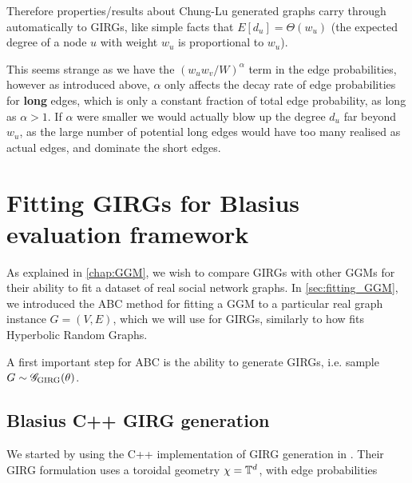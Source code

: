 Therefore properties/results about Chung-Lu generated graphs carry through automatically to GIRGs, like simple facts that $E[d_u] = \Theta(w_u)$ (the expected degree of a node $u$ with weight $w_u$ is proportional to $w_u$).

This seems strange as we have the $(w_u w_v / W)^\alpha$ term in the edge probabilities, however as introduced above, $\alpha$ only affects the decay rate of edge probabilities for \textbf{long} edges, which is only a constant fraction of total edge probability, as long as $\alpha > 1$. If $\alpha$ were smaller we would actually blow up the degree $d_u$ far beyond $w_u$, as the large number of potential long edges would have too many realised as actual edges, and dominate the short edges.




\section{Fitting GIRGs for Blasius evaluation framework}
As explained in \cref{chap:GGM}, we wish to compare GIRGs with other GGMs for their ability to fit a dataset of real social network graphs. 
In \cref{sec:fitting_GGM}, we introduced the ABC method for fitting a GGM to a particular real graph instance $G = (V, E)$, which we will use for GIRGs, similarly to how \cite{blasius2018towards} fits Hyperbolic Random Graphs.

A first important step for ABC is the ability to generate GIRGs, i.e. sample $G \sim \mathscr{G}_{\mathrm{GIRG}}(\theta)$.

\subsection{Blasius C++ GIRG generation}
We started by using the C++ implementation of GIRG generation in \cite{blasius2022efficiently}. Their GIRG formulation uses a toroidal geometry $\chi = \mathbb{T}^d$, with edge probabilities 

